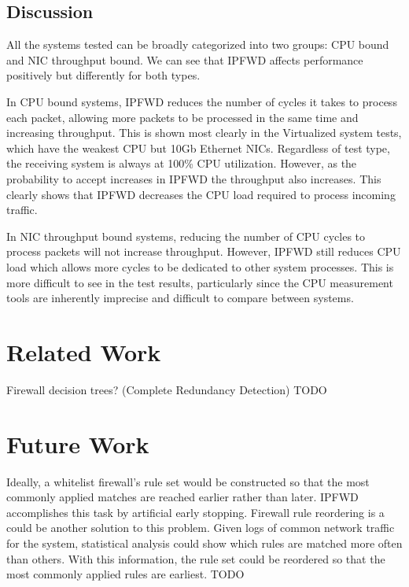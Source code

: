 \documentclass[journal]{IEEEtran}
\begin{document}
  \subsection{Discussion} 

  All the systems tested can be broadly categorized into two groups: CPU bound
  and NIC throughput bound. We can see that IPFWD affects performance
  positively but differently for both types. 

  In CPU bound systems, IPFWD reduces the number of cycles it takes to process
  each packet, allowing more packets to be processed in the same time and
  increasing throughput. This is shown most clearly in the Virtualized system
  tests, which have the weakest CPU but 10Gb Ethernet NICs. Regardless of test
  type, the receiving system is always at 100\% CPU utilization. However, as
  the probability to accept increases in IPFWD the throughput also increases.
  This clearly shows that IPFWD decreases the CPU load required to process
  incoming traffic.

  In NIC throughput bound systems, reducing the number of CPU cycles to process
  packets will not increase throughput. However, IPFWD still reduces CPU load
  which allows more cycles to be dedicated to other system processes. This is
  more difficult to see in the test results, particularly since the CPU
  measurement tools are inherently imprecise and difficult to compare between
  systems.


\section{Related Work}

Firewall decision trees? (Complete Redundancy Detection)
TODO



\section{Future Work}
Ideally, a whitelist firewall's rule set would be constructed so that the most
commonly applied matches are reached earlier rather than later. IPFWD
accomplishes this task by artificial early stopping. Firewall rule reordering
is a could be another solution to this problem. Given logs of common network
traffic for the system, statistical analysis could show which rules are matched
more often than others. With this information, the rule set could be reordered
so that the most commonly applied rules are earliest.
TODO
\end{document}
